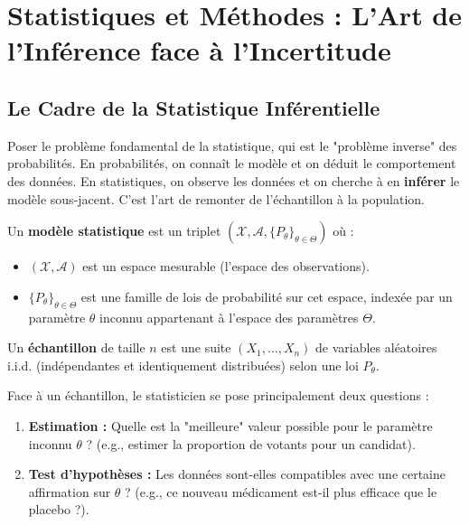 \chapter{Statistiques et Méthodes : L'Art de l'Inférence face à l'Incertitude}

\section{Le Cadre de la Statistique Inférentielle}

\begin{objectif}
    Poser le problème fondamental de la statistique, qui est le "problème inverse" des probabilités. En probabilités, on connaît le modèle et on déduit le comportement des données. En statistiques, on observe les données et on cherche à en \textbf{inférer} le modèle sous-jacent. C'est l'art de remonter de l'échantillon à la population.
\end{objectif}

\begin{definition}
    Un \textbf{modèle statistique} est un triplet $(\mathcal{X}, \mathcal{A}, \{P_\theta\}_{\theta \in \Theta})$ où :
    \begin{itemize}
        \item $(\mathcal{X}, \mathcal{A})$ est un espace mesurable (l'espace des observations).
        \item $\{P_\theta\}_{\theta \in \Theta}$ est une famille de lois de probabilité sur cet espace, indexée par un paramètre $\theta$ inconnu appartenant à l'espace des paramètres $\Theta$.
    \end{itemize}
    Un \textbf{échantillon} de taille $n$ est une suite $(X_1, \dots, X_n)$ de variables aléatoires i.i.d. (indépendantes et identiquement distribuées) selon une loi $P_\theta$.
\end{definition}

\begin{remark}
    Face à un échantillon, le statisticien se pose principalement deux questions :
    \begin{enumerate}
        \item \textbf{Estimation :} Quelle est la "meilleure" valeur possible pour le paramètre inconnu $\theta$ ? (e.g., estimer la proportion de votants pour un candidat).
        \item \textbf{Test d'hypothèses :} Les données sont-elles compatibles avec une certaine affirmation sur $\theta$ ? (e.g., ce nouveau médicament est-il plus efficace que le placebo ?).
    \end{enumerate}
\end{remark}

